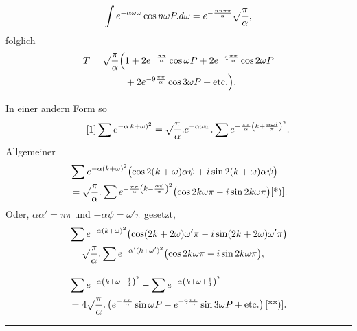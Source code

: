 \[\int e^{-\alpha\omega\omega}\cos n\omega P.d\omega=e^{-\frac{nn\pi\pi}{\alpha}}\surd\frac\pi\alpha,\]
\noindent folglich
\[\begin{aligned}
T=\surd\frac\pi\alpha\Bigl(&1+2e^{-\frac{\pi\pi}{\alpha}}\cos\omega P+2e^{-4\frac{\pi\pi}{\alpha}}\cos2\omega P\\
&+2e^{-9\frac{\pi\pi}{\alpha}}\cos3\omega P+\text{etc.}\Bigr).
\end{aligned}\]
\par\indent In einer andern Form so
\begin{equation*}\tag*{[1]}
\sum e^{-\alpha\,k+\omega)^2}=\surd\frac\pi\alpha.e^{-\alpha\omega\omega}.\sum e^{-\frac{\pi\pi}{\alpha}\left(k+\frac{\alpha\omega i}{\pi}\right)^2}.
\end{equation*}
\noindent Allgemeiner
\[\begin{aligned}
&\sum e^{-\alpha(k+\omega)^2}\bigl(\cos2(k+\omega)\alpha\psi+i\sin2(k+\omega)\alpha\psi\bigr)\\
&=\surd\frac\pi\alpha.\sum e^{-\frac{\pi\pi}{\alpha}\left(k-\frac{\alpha\psi}{\pi}\right)^2}\bigl(\cos2k\omega\pi-i\sin2k\omega\pi\bigr)[\text{*)}].
\end{aligned}\]
\noindent Oder, $\alpha\alpha'=\pi\pi$ und $-\alpha\psi=\omega'\pi$ gesetzt,
\[\begin{aligned}
&\sum e^{-\alpha(k+\omega)^2}\bigl(\cos(2k+2\omega)\omega'\pi-i\sin(2k+2\omega)\omega'\pi\bigr)\\
&=\surd\frac\pi\alpha.\sum e^{-\alpha'(k+\omega')^2}\bigl(\cos2k\omega\pi-i\sin2k\omega\pi\bigr),\\[1em]
&\sum e^{-\alpha\left(k+\omega-\frac14\right)^2}-\sum e^{-\alpha\left(k+\omega+\frac14\right)^2}\\
&=4\surd\frac\pi\alpha.\left(e^{-\frac{\pi\pi}{\alpha}}\sin\omega P-e^{-9\frac{\pi\pi}{\alpha}}\sin3\omega P+\text{etc.}\right)[\text{**)}].
\end{aligned}\]
\ClosingRule
{}
\par\smallskip\noindent\rule{.25\linewidth}{.4pt}\par
{\small
\par{}
\par{}
\par}
\clearpage
{}

